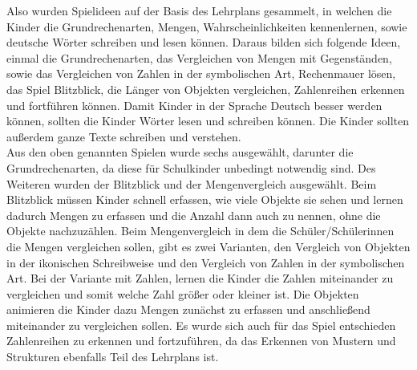 Also wurden Spielideen auf der Basis des Lehrplans gesammelt, in welchen die Kinder die Grundrechenarten, Mengen, Wahrscheinlichkeiten kennenlernen, sowie deutsche Wörter schreiben und lesen können. Daraus bilden sich folgende Ideen, einmal die Grundrechenarten, das Vergleichen von Mengen mit Gegenständen, sowie das Vergleichen von Zahlen in der symbolischen Art, Rechenmauer lösen, das Spiel Blitzblick, die Länger von Objekten vergleichen, Zahlenreihen erkennen und fortführen können. Damit Kinder in der Sprache Deutsch besser werden können, sollten die Kinder Wörter lesen und schreiben können. Die Kinder sollten außerdem ganze Texte schreiben und verstehen.\\
Aus den oben genannten Spielen wurde sechs ausgewählt, darunter die Grundrechenarten, da diese für Schulkinder unbedingt notwendig sind. Des Weiteren wurden der Blitzblick und der Mengenvergleich ausgewählt. Beim Blitzblick müssen Kinder schnell erfassen, wie viele Objekte sie sehen und lernen dadurch Mengen zu erfassen und die Anzahl dann auch zu nennen, ohne die Objekte nachzuzählen. Beim Mengenvergleich in dem die Schüler/Schülerinnen die Mengen vergleichen sollen, gibt es zwei Varianten, den Vergleich von Objekten in der ikonischen Schreibweise und den Vergleich von Zahlen in der symbolischen Art. Bei der Variante mit Zahlen, lernen die Kinder die Zahlen miteinander zu vergleichen und somit welche Zahl größer oder kleiner ist. Die Objekten animieren die Kinder dazu Mengen zunächst zu erfassen und anschließend miteinander zu vergleichen sollen. Es wurde sich auch für das Spiel entschieden Zahlenreihen zu erkennen und fortzuführen, da das Erkennen von Mustern und Strukturen ebenfalls Teil des Lehrplans ist. %
